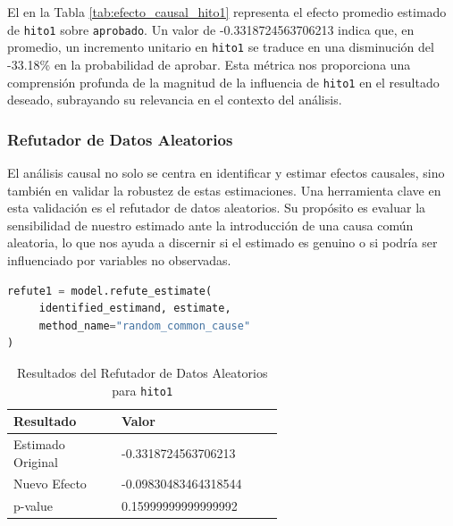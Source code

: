 El  en la Tabla \ref{tab:efecto_causal_hito1} representa el efecto promedio estimado de \texttt{hito1} sobre \texttt{aprobado}. Un valor de -0.3318724563706213 indica que, en promedio, un incremento unitario en \texttt{hito1} se traduce en una disminución del -33.18\% en la probabilidad de aprobar. Esta métrica nos proporciona una comprensión profunda de la magnitud de la influencia de \texttt{hito1} en el resultado deseado, subrayando su relevancia en el contexto del análisis.

\subsubsection{Refutador de Datos Aleatorios}

El análisis causal no solo se centra en identificar y estimar efectos causales, sino también en validar la robustez de estas estimaciones. Una herramienta clave en esta validación es el refutador de datos aleatorios. Su propósito es evaluar la sensibilidad de nuestro estimado ante la introducción de una causa común aleatoria, lo que nos ayuda a discernir si el estimado es genuino o si podría ser influenciado por variables no observadas.

\begin{minipage}{0.5\textwidth}
    \begin{lstlisting}[language=Python, caption=Refutador de datos aleatorios para \texttt{hito1}, label=lst:RefutadorDatosAleatoriosHito1]
refute1 = model.refute_estimate(
     identified_estimand, estimate, 
     method_name="random_common_cause"
)
\end{lstlisting}
\end{minipage}
\hfill
\begin{minipage}{0.45\textwidth}
    \begin{table}[H]
        \centering        
        \begin{tabular}{lp{0.6\linewidth}}
            \toprule
            \textbf{Resultado} & \textbf{Valor} \\
            \midrule
            Estimado Original & -0.3318724563706213 \\
            Nuevo Efecto & -0.09830483464318544 \\
            p-value & 0.15999999999999992 \\
            \bottomrule
        \end{tabular}
        \caption{Resultados del Refutador de Datos Aleatorios para \texttt{hito1}}
        \label{tab:refutador_datos_aleatorios_hito1}
    \end{table}
\end{minipage}

